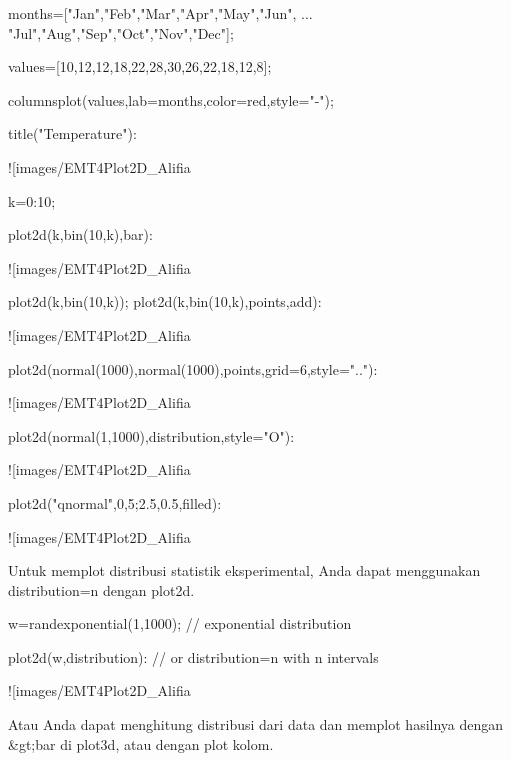 \documentclass{article}
\begin{document}
\>months=["Jan","Feb","Mar","Apr","May","Jun", ...  
\>     "Jul","Aug","Sep","Oct","Nov","Dec"];

\>values=[10,12,12,18,22,28,30,26,22,18,12,8];

\>columnsplot(values,lab=months,color=red,style="-");

\>title("Temperature"):


![images/EMT4Plot2D_Alifia%

\>k=0:10;

\>plot2d(k,bin(10,k),\>bar):


![images/EMT4Plot2D_Alifia%

\>plot2d(k,bin(10,k)); plot2d(k,bin(10,k),\>points,\>add):


![images/EMT4Plot2D_Alifia%

\>plot2d(normal(1000),normal(1000),\>points,grid=6,style=".."):


![images/EMT4Plot2D_Alifia%

\>plot2d(normal(1,1000),\>distribution,style="O"):


![images/EMT4Plot2D_Alifia%

\>plot2d("qnormal",0,5;2.5,0.5,\>filled):


![images/EMT4Plot2D_Alifia%

Untuk memplot distribusi statistik eksperimental, Anda dapat
menggunakan distribution=n dengan plot2d.


\>w=randexponential(1,1000); // exponential distribution

\>plot2d(w,\>distribution): // or distribution=n with n intervals


![images/EMT4Plot2D_Alifia%

Atau Anda dapat menghitung distribusi dari data dan memplot hasilnya
dengan &gt;bar di plot3d, atau dengan plot kolom.
\end{document}
